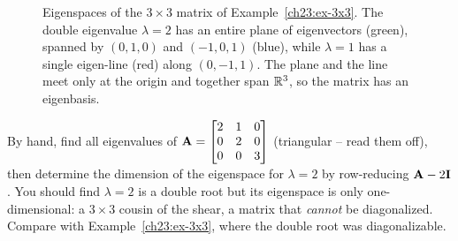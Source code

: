 \begin{figure}[H]
\centering
{}
\caption{Eigenspaces of the $3\times 3$ matrix of Example~\ref{ch23:ex-3x3}. The
double eigenvalue $\lambda=2$ has an entire plane of eigenvectors (green), spanned by
$(0,1,0)$ and $(-1,0,1)$ (blue), while $\lambda=1$ has a single
eigen-line (red) along $(0,-1,1)$. The plane and the line meet only at the origin
and together span $\mathbb{R}^3$, so the matrix has an eigenbasis.}
\label{ch23:fig-3x3}
\end{figure}


\begin{labbox}
By hand, find all eigenvalues of
$\mathbf{A}=\begin{bmatrix}2 & 1 & 0\\ 0 & 2 & 0\\ 0 & 0 & 3\end{bmatrix}$
(triangular -- read them off), then determine the dimension of the eigenspace for
$\lambda=2$ by row-reducing $\mathbf{A}-2\mathbf{I}$. You should find $\lambda=2$ is a
double root but its eigenspace is only one-dimensional: a $3\times 3$ cousin of the
shear, a matrix that \emph{cannot} be diagonalized. Compare with
Example~\ref{ch23:ex-3x3}, where the double root was diagonalizable.
\end{labbox}

